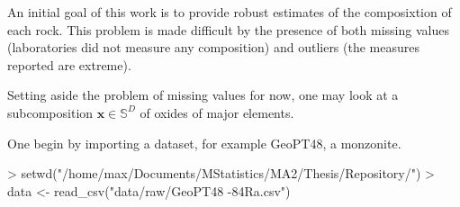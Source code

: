 \documentclass[a4paper,oneside,12pt,titlepage]{article}
\begin{document}
An initial goal of this work is to provide robust estimates of the composixtion of each rock. This problem is made difficult by the presence of both missing values (laboratories did not measure any composition) and outliers (the measures reported are extreme).

Setting aside the problem of missing values for now, one may look at a subcomposition $\mathbf{x} \in \mathbb{S}^D$ of oxides of major elements.

One begin by importing a dataset, for example GeoPT48, a monzonite.




\begin{Schunk}
\begin{Sinput}
> setwd("/home/max/Documents/MStatistics/MA2/Thesis/Repository/")
> data <- read_csv("data/raw/GeoPT48 -84Ra.csv")
\end{Sinput}
\end{Schunk}
\end{document}
